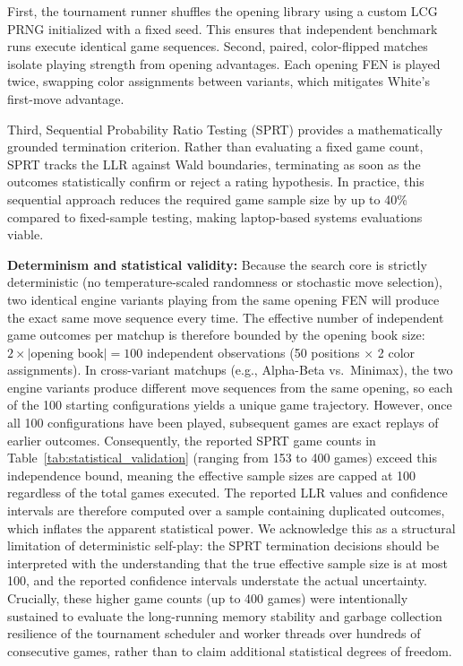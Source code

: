 First, the tournament runner shuffles the opening library using a custom LCG PRNG initialized with a fixed seed. This ensures that independent benchmark runs execute identical game sequences. Second, paired, color-flipped matches isolate playing strength from opening advantages. Each opening FEN is played twice, swapping color assignments between variants, which mitigates White's first-move advantage.

Third, Sequential Probability Ratio Testing (SPRT) provides a mathematically grounded termination criterion. Rather than evaluating a fixed game count, SPRT tracks the LLR against Wald boundaries, terminating as soon as the outcomes statistically confirm or reject a rating hypothesis. In practice, this sequential approach reduces the required game sample size by up to 40\% compared to fixed-sample testing, making laptop-based systems evaluations viable.

\textbf{Determinism and statistical validity:} Because the search core is strictly deterministic (no temperature-scaled randomness or stochastic move selection), two identical engine variants playing from the same opening FEN will produce the exact same move sequence every time. The effective number of independent game outcomes per matchup is therefore bounded by the opening book size: $2 \times |\text{opening book}| = 100$ independent observations (50 positions $\times$ 2 color assignments). In cross-variant matchups (e.g., Alpha-Beta vs.\ Minimax), the two engine variants produce different move sequences from the same opening, so each of the 100 starting configurations yields a unique game trajectory. However, once all 100 configurations have been played, subsequent games are exact replays of earlier outcomes. Consequently, the reported SPRT game counts in Table~\ref{tab:statistical_validation} (ranging from 153 to 400 games) exceed this independence bound, meaning the effective sample sizes are capped at 100 regardless of the total games executed. The reported LLR values and confidence intervals are therefore computed over a sample containing duplicated outcomes, which inflates the apparent statistical power. We acknowledge this as a structural limitation of deterministic self-play: the SPRT termination decisions should be interpreted with the understanding that the true effective sample size is at most 100, and the reported confidence intervals understate the actual uncertainty. Crucially, these higher game counts (up to 400 games) were intentionally sustained to evaluate the long-running memory stability and garbage collection resilience of the tournament scheduler and worker threads over hundreds of consecutive games, rather than to claim additional statistical degrees of freedom.

